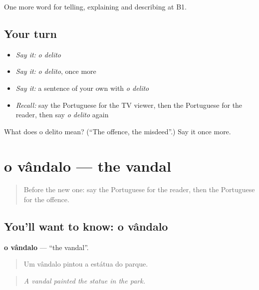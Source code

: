 \begin{grammarlens}[title={What you've built}]
One more word for telling, explaining and describing at B1.
\end{grammarlens}

\subsection*{Your turn}
\begin{itemize}
\raggedright
  \item \emph{Say it:} \emph{o delito}
  \item \emph{Say it:} \emph{o delito}, once more
  \item \emph{Say it:} a sentence of your own with \emph{o delito}
  \item \emph{Recall:} say the Portuguese for the TV viewer, then the Portuguese for the reader, then say \emph{o delito} again
\end{itemize}

\begin{tcolorbox}[breakable,colback=teal!4,colframe=teal!35!black,title={Before you move on}]
What does o delito mean? (\textquotedblleft{}The offence, the misdeed\textquotedblright{}.) Say it once more.
\end{tcolorbox}
\section[o vândalo]{o vândalo — the vandal}

\label{lesson:PT-C286-vandalo}



\begin{quote}
Before the new one: say the Portuguese for the reader, then the Portuguese for the offence.
\end{quote}

\subsection*{You'll want to know: o vândalo}
\textbf{o vândalo} — \textquotedblleft{}the vandal\textquotedblright{}.

\begin{quote}
Um vândalo pintou a estátua do parque.
\end{quote}

\begin{quote}
\emph{A vandal painted the statue in the park.}
\end{quote}

